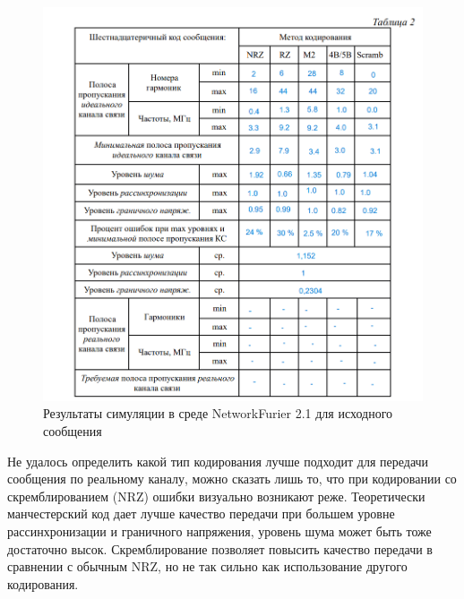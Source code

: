 \begin{figure}
    \centering
    \includegraphics[width=\textwidth]{res/table-2.png}
    \caption{Результаты симуляции в среде NetworkFurier 2.1 для исходного сообщения}
    \label{fig:table-2}
\end{figure}


Не удалось определить какой тип кодирования лучше подходит для передачи сообщения по реальному каналу, можно сказать лишь то, что при кодировании со скремблированием (NRZ) ошибки визуально возникают реже. Теоретически манчестерский код дает лучше качество передачи при большем уровне рассинхронизации и граничного напряжения, уровень шума может быть тоже достаточно высок. Скремблирование позволяет повысить качество передачи в сравнении с обычным NRZ, но не так сильно как использование другого кодирования.  

\newpage






